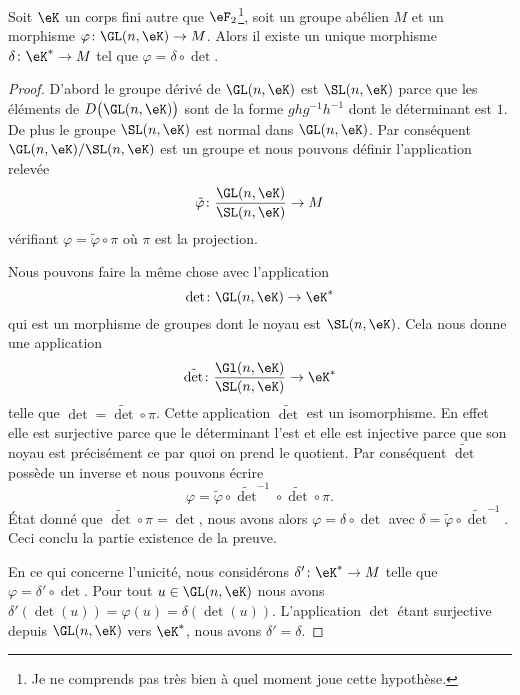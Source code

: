 \begin{lemma}   \label{LemcDOTzM}
    Soit \( \eK\) un corps fini autre que \( \eF_2\)\footnote{Je ne comprends pas très bien à quel moment joue cette hypothèse.}, soit un groupe abélien \( M\) et un morphisme \( \varphi\colon \GL(n,\eK)\to M\). Alors il existe un unique morphisme \( \delta\colon \eK^*\to M\) tel que \( \varphi=\delta\circ\det\).
\end{lemma}

\begin{proof}
    D'abord le groupe dérivé de \( \GL(n,\eK)\) est \( \SL(n,\eK)\) parce que les éléments de \( D\big( \GL(n,\eK) \big)\) sont de la forme \( ghg^{-1}h^{-1}\) dont le déterminant est \( 1\). De plus le groupe \( \SL(n,\eK)\) est normal dans \( \GL(n,\eK)\). Par conséquent \( \GL(n,\eK)/\SL(n,\eK)\) est un groupe et nous pouvons définir l'application relevée
    \begin{equation}
        \tilde \varphi\colon \frac{ \GL(n,\eK) }{ \SL(n,\eK) }\to M
    \end{equation}
    vérifiant \( \varphi=\tilde \varphi\circ\pi\) où \( \pi\) est la projection. 

    Nous pouvons faire la même chose avec l'application
    \begin{equation}
        \det\colon \GL(n,\eK)\to \eK^*
    \end{equation}
    qui est un morphisme de groupes dont le noyau est \( \SL(n,\eK)\). Cela nous donne une application
    \begin{equation}
        \tilde \det\colon \frac{ \Gl(n,\eK) }{ \SL(n,\eK) }\to \eK^*
    \end{equation}
    telle que \( \det=\tilde \det\circ\pi\). Cette application \( \tilde \det\) est un isomorphisme. En effet elle est surjective parce que le déterminant l'est et elle est injective parce que son noyau est précisément ce par quoi on prend le quotient. Par conséquent \( \tilde \det \) possède un inverse et nous pouvons écrire
    \begin{equation}
        \varphi=\tilde \varphi\circ\tilde \det^{-1}\circ\tilde \det\circ\pi.
    \end{equation}
    État donné que \( \tilde \det\circ\pi=\det\), nous avons alors \( \varphi=\delta\circ\det\) avec \( \delta=\tilde \varphi\circ\tilde \det^{-1}\). Ceci conclu la partie existence de la preuve.

    En ce qui concerne l'unicité, nous considérons \( \delta'\colon \eK^*\to M\) telle que \( \varphi=\delta'\circ\det\). Pour tout \( u\in \GL(n,\eK)\) nous avons \( \delta'(\det(u))=\varphi(u)=\delta(\det(u))\). L'application \( \det\) étant surjective depuis \( \GL(n,\eK)\) vers \( \eK^*\), nous avons \( \delta'=\delta\).
\end{proof}

